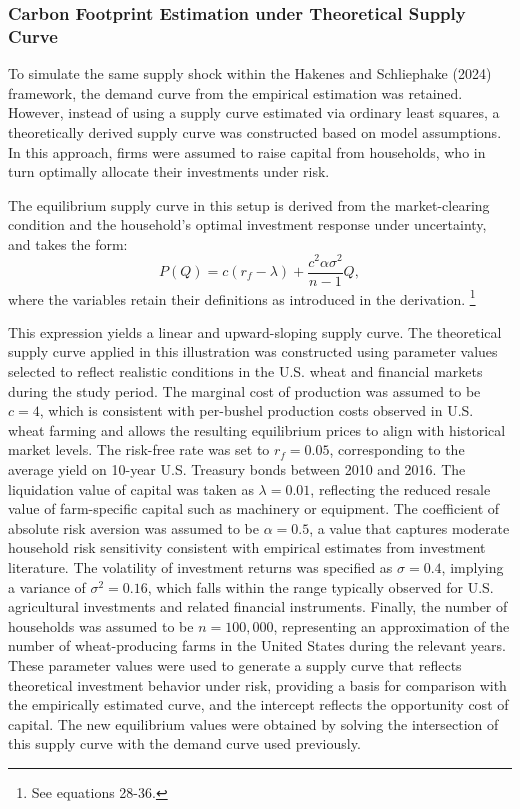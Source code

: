 \documentclass[12pt,a4paper]{article}%
\begin{document}
\subsubsection{Carbon Footprint Estimation under Theoretical Supply Curve}

To simulate the same supply shock within the Hakenes and Schliephake (2024) framework, the demand curve from the empirical estimation was retained. However, instead of using a supply curve estimated via ordinary least squares, a theoretically derived supply curve was constructed based on model assumptions. In this approach, firms were assumed to raise capital from households, who in turn optimally allocate their investments under risk.

The equilibrium supply curve in this setup is derived from the market-clearing condition and the household's optimal investment response under uncertainty, and takes the form:
\[
P(Q) = c(r_f - \lambda) + \frac{c^2 \alpha \sigma^2}{n - 1} Q,
\]
where the variables retain their definitions as introduced in the derivation. \footnote{See equations 28-36.}

This expression yields a linear and upward-sloping supply curve. The theoretical supply curve applied in this illustration was constructed using parameter values selected to reflect realistic conditions in the U.S. wheat and financial markets during the study period. The marginal cost of production was assumed to be $c = 4$, which is consistent with per-bushel production costs observed in U.S. wheat farming and allows the resulting equilibrium prices to align with historical market levels. The risk-free rate was set to $r_f = 0.05$, corresponding to the average yield on 10-year U.S. Treasury bonds between 2010 and 2016. The liquidation value of capital was taken as $\lambda = 0.01$, reflecting the reduced resale value of farm-specific capital such as machinery or equipment. The coefficient of absolute risk aversion was assumed to be $\alpha = 0.5$, a value that captures moderate household risk sensitivity consistent with empirical estimates from investment literature. The volatility of investment returns was specified as $\sigma = 0.4$, implying a variance of $\sigma^2 = 0.16$, which falls within the range typically observed for U.S. agricultural investments and related financial instruments. Finally, the number of households was assumed to be $n = 100{,}000$, representing an approximation of the number of wheat-producing farms in the United States during the relevant years. These parameter values were used to generate a supply curve that reflects theoretical investment behavior under risk, providing a basis for comparison with the empirically estimated curve, and the intercept reflects the opportunity cost of capital. The new equilibrium values were obtained by solving the intersection of this supply curve with the demand curve used previously.
\end{document}

